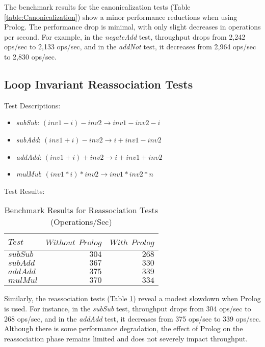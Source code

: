 \vspace{-10pt}

The benchmark results for the canonicalization tests (Table \ref{table:Canonicalization}) show a minor performance reductions when using Prolog. The performance drop is minimal, with only slight decreases in operations per second. For example, in the \textit{negateAdd} test, throughput drops from 2,242 ops/sec to 2,133 ops/sec, and in the \textit{addNot} test, it decreases from 2,964 ops/sec to 2,830 ops/sec.

\subsection*{Loop Invariant Reassociation Tests}
Test Descriptions:
\begin{itemize}
    \item \textit{subSub}: $(inv1 - i) - inv2 \rightarrow inv1 - inv2 - i$
    \item \textit{subAdd}: $(inv1 + i) - inv2 \rightarrow i + inv1 - inv2$
    \item \textit{addAdd}: $(inv1 + i) + inv2 \rightarrow i + inv1 + inv2$
    \item \textit{mulMul}: $(inv1 * i) * inv2 \rightarrow inv1 * inv2 * n$
\end{itemize}

Test Results:
\begin{table}[h]
    \centering
    \begin{tabular}{|l|r|r|}
        \hline
        $Test$ & $Without$ $Prolog$ & $With$ $Prolog$ \\
        \hline
        $subSub$ & $304$ & $268$ \\
        $subAdd$ & $367$ & $330$ \\
        $addAdd$ & $375$ & $339$ \\
        $mulMul$ & $370$ & $334$ \\
        \hline
    \end{tabular}
    \caption{Benchmark Results for Reassociation Tests (Operations/Sec)}
    \label{table:Reassociation}
\end{table}

\vspace{-10pt}

Similarly, the reassociation tests (Table \ref{table:Reassociation}) reveal a modest slowdown when Prolog is used. For instance, in the \textit{subSub} test, throughput drops from 304 ops/sec to 268 ops/sec, and in the \textit{addAdd} test, it decreases from 375 ops/sec to 339 ops/sec. Although there is some performance degradation, the effect of Prolog on the reassociation phase remains limited and does not severely impact throughput.

